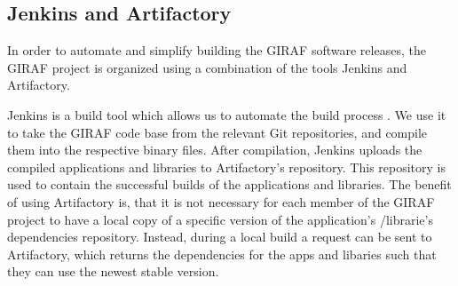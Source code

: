 \subsection{Jenkins and Artifactory}
In order to automate and simplify building the GIRAF software releases, the
GIRAF project is organized using a combination of the tools Jenkins and
Artifactory.\nl

Jenkins is a build tool which allows us to automate the build
process \citep{Jenkins}. We use it to take the GIRAF code base from the
relevant Git repositories, and compile them into the respective binary files.
After compilation, Jenkins uploads the compiled applications and libraries to
Artifactory's repository. This repository is used to contain the successful
builds of the applications and libraries. The benefit of using Artifactory is,
that it is not necessary for each member of the GIRAF project to have a local
copy of a specific version of the application's /librarie's dependencies
repository. Instead, during a local build a request can be sent to
Artifactory, which returns the dependencies for the apps and libaries such that they can use
the newest stable version.

